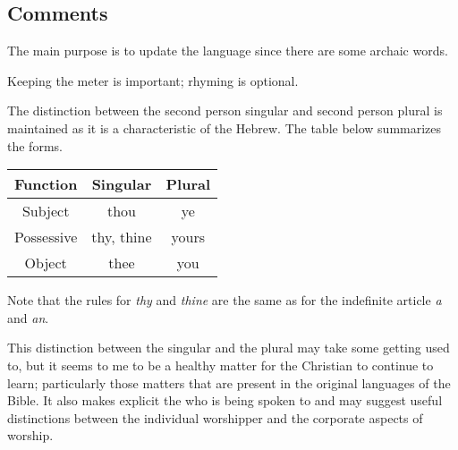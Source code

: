 \subsection*{Comments}

The main purpose is to update the language since there are some archaic words.

Keeping the meter is important; rhyming is optional.

The distinction between the second person singular and second person plural is maintained as it is a characteristic of the Hebrew. The table below summarizes the forms.

\begin{longtable}[]{@{}ccc@{}}
\toprule\noalign{}
Function & Singular & Plural \\
\midrule\noalign{}
\endhead
\bottomrule\noalign{}
\endlastfoot
Subject & thou & ye \\
Possessive & thy, thine & yours \\
Object & thee & you \\
\end{longtable}

Note that the rules for \emph{thy} and \emph{thine} are the same as for the indefinite article \emph{a} and \emph{an}.  

This distinction between the singular and the plural may take some getting used to, but it seems to me to be a healthy matter for the Christian to continue to learn; particularly those matters that are present in the original languages of the Bible.  It also makes explicit the who is being spoken to and may suggest useful distinctions between the individual worshipper and the corporate aspects of worship.

